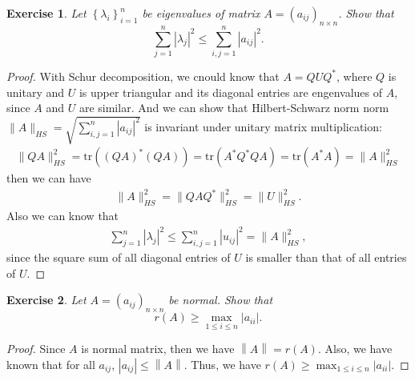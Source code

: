 \documentclass[11pt]{book}
\newtheorem{exercise}{Exercise}[section]
\theoremstyle{definition}
\numberwithin{equation}{chapter}
\begin{document}
\medskip

\begin{exercise}
Let $\left\{  \lambda_{i}\right\}  _{i=1}^{n}$ be eigenvalues of matrix
$A=\left(  a_{ij}\right)  _{n\times n}$. Show that%
$$
\sum_{j=1}^{n}\left\vert \lambda_{j}\right\vert ^{2}\leq\sum_{i,j=1}%
^{n}\left\vert a_{ij}\right\vert ^{2}.
$$
\end{exercise}
\begin{proof}
With Schur decomposition, we cnould know that $A = Q U Q^*$, where $Q$ is unitary and $U$ is upper triangular and its diagonal entries are engenvalues of $A$, since $A$ and $U$ are similar. And we can show that Hilbert-Schwarz norm norm $\|A\|_{HS} = \sqrt{\sum_{i,j=1}^{n} \left|a_{ij}\right|^2}$ is invariant under unitary matrix multiplication:
\begin{align*}
    \|QA\|_{HS}^2 = \text{tr} \left((QA)^* (QA)\right) = \text{tr} \left(A^* Q^* QA\right) = \text{tr} \left(A^* A\right) = \|A\|_{HS}^2
\end{align*}
then we can have 
\begin{align*}
    \|A\|_{HS}^2 = \|QAQ^*\|_{HS}^2 = \|U\|_{HS}^2.
\end{align*}
Also we can know that
\begin{align*}
    \sum_{j=1}^{n}\left| \lambda_{j}\right|^{2}\leq \sum_{i,j=1}^{n}\left| u_{ij}\right|^{2} = \|A\|_{HS}^2,
\end{align*}
since the square sum of all diagonal entries of $U$ is smaller than that of all entries of $U$.
\end{proof}

\medskip

\begin{exercise}
Let $A=\left(  a_{ij}\right)  _{n\times n}$ be normal. Show that%
$$
r\left(  A\right)  \geq\max_{1\leq i\leq n}\left\vert a_{ii}\right\vert .
$$
\end{exercise}
\begin{proof}
Since $A$ is normal matrix, then we have $\left\|A\right\| = r(A)$. Also, we have known that for all $a_{ij}$, $\left|a_{ij}\right|\leq \left\|A\right\|$. Thus, we have $r(A)\geq \max_{1\leq i\leq n}\left|a_{ii}\right|$.
\end{proof}

\medskip
\end{document}
